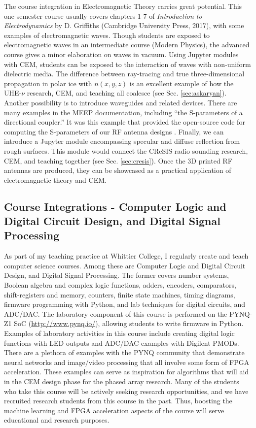 \documentclass[../../main.tex]{subfiles}
\begin{document}
The course integration in Electromagnetic Theory carries great potential.  This one-semester course usually covers chapters 1-7 of \textit{Introduction to Electrodynamics} by D. Griffiths (Cambridge University Press, 2017), with some examples of electromagnetic waves.  Though students are exposed to electromagnetic waves in an intermediate course (Modern Physics), the advanced course gives a minor elaboration on waves in vacuum.  Using Jupyter modules with CEM, students can be exposed to the interaction of waves with non-uniform dielectric media.  The difference between ray-tracing and true three-dimensional propagation in polar ice with $n(x,y,z)$ is an excellent example of how the UHE-$\nu$ research, CEM, and teaching all coalesce (see Sec. \ref{sec:askaryan}).  Another possibility is to introduce waveguides and related devices.  There are many examples in the MEEP documentation, including ``the S-parameters of a directional coupler.''  It was this example that provided the open-source code for computing the S-parameters of our RF antenna designs \cite{meepcon2022}.  Finally, we can introduce a Jupyter module encompassing specular and diffuse reflection from rough surfaces.  This module would connect the CReSIS radio sounding research, CEM, and teaching together (see Sec. \ref{sec:cresis}).  Once the 3D printed RF antennas are produced, they can be showcased as a practical application of electromagnetic theory and CEM.  \\ \vspace{2.5mm}

\subsection{Course Integrations - Computer Logic and Digital Circuit Design, and Digital Signal Processing}

As part of my teaching practice at Whittier College, I regularly create and teach computer science courses.  Among these are Computer Logic and Digital Circuit Design, and Digital Signal Processing.  The former covers number systems, Boolean algebra and complex logic functions, adders, encoders, comparators, shift-registers and memory, counters, finite state machines, timing diagrams, firmware programming with Python, and lab techniques for digital circuits, and ADC/DAC.  The laboratory component of this course is performed on the PYNQ-Z1 SoC (\url{http://www.pynq.io/}), allowing students to write firmware in Python.  Examples of laboratory activities in this course include creating digital logic functions with LED outputs and ADC/DAC examples with Digilent PMODs.  There are a plethora of examples with the PYNQ community that demonstrate neural networks and image/video processing that all involve some form of FPGA acceleration.  These examples can serve as inspiration for algorithms that will aid in the CEM design phase for the phased array research.  Many of the students who take this course will be actively seeking research opportunities, and we have recruited research students from this course in the past.  Thus, boosting the machine learning and FPGA acceleration aspects of the course will serve educational and research purposes. \\ \vspace{2.5mm}
\end{document}
